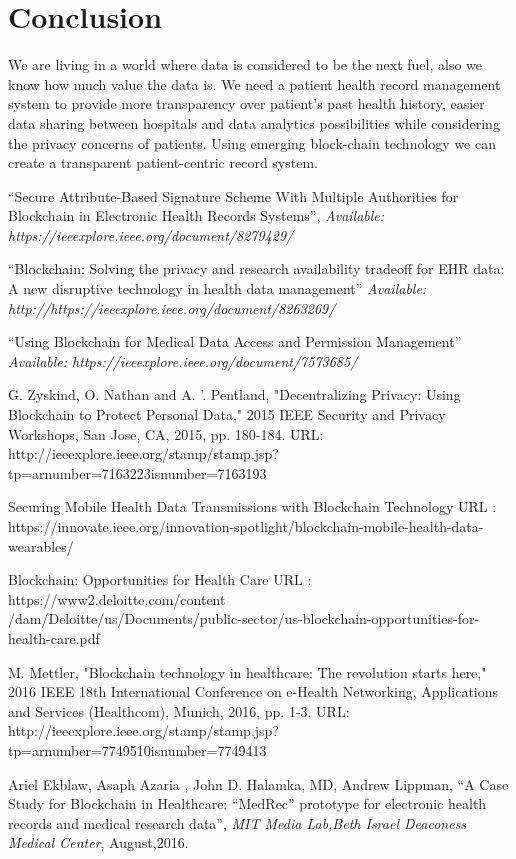 \documentclass[11pt]{report}
\begin{document}
\chapter{Conclusion}
           We are living in a world where data is considered to be the next fuel, also we know how much
value the data is.  We need a patient health record management system to provide more transparency over patient’s past health history, easier data sharing between hospitals and data analytics possibilities while considering the privacy concerns of patients. Using emerging block-chain technology we can create a transparent patient-centric record system. 




\begin{thebibliography}{999}



 \textquotedblleft  Secure Attribute-Based Signature Scheme With Multiple Authorities for Blockchain in Electronic Health Records Systems\textquotedblright, \textit 
{Available: https://ieeexplore.ieee.org/document/8279429/}


 \textquotedblleft Blockchain: Solving the privacy and research availability tradeoff for EHR data: A new disruptive technology in health data management\textquotedblright 
\textit{Available: http://https://ieeexplore.ieee.org/document/8263269/}

 \textquotedblleft Using Blockchain for Medical Data Access and Permission Management\textquotedblright 
\textit{Available: https://ieeexplore.ieee.org/document/7573685/}


G. Zyskind, O. Nathan and A. '. Pentland, "Decentralizing Privacy: Using Blockchain to Protect Personal Data," 2015 IEEE Security and Privacy Workshops, San Jose, CA, 2015, pp. 180-184.
URL: http://ieeexplore.ieee.org/stamp/stamp.jsp?tp=arnumber=7163223isnumber=7163193

Securing Mobile Health Data Transmissions with Blockchain Technology
URL : https://innovate.ieee.org/innovation-spotlight/blockchain-mobile-health-data-wearables/

Blockchain: 
Opportunities for Health Care 
URL : https://www2.deloitte.com/content\\/dam/Deloitte/us/Documents/public-sector/us-blockchain-opportunities-for-health-care.pdf

M. Mettler, "Blockchain technology in healthcare: The revolution starts here," 2016 IEEE 18th International Conference on e-Health Networking, Applications and Services (Healthcom), Munich, 2016, pp. 1-3.
URL: http://ieeexplore.ieee.org/stamp/stamp.jsp?tp=arnumber=7749510isnumber=7749413

 Ariel Ekblaw, Asaph Azaria , John D. Halamka, MD, Andrew Lippman, \textquotedblleft A Case Study for Blockchain in Healthcare:
“MedRec” prototype for electronic health records and medical research data\textquotedblright, \textit{MIT Media Lab,Beth Israel Deaconess Medical Center}, August,2016.

\end{thebibliography}
 
\end{document}
